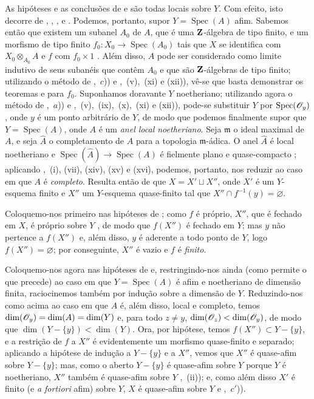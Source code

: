 \begin{env}[8.11.4]
\label{IV.8.11.4}
As hipóteses e as conclusões de  e  são todas locais sobre $Y$.
Com efeito, isto decorre de , , ,  e .
Podemos, portanto, supor $Y=\operatorname{Spec}(A)$ afim.
Sabemos então que existem um subanel $A_0$ de $A$, que é uma $\mathbf{Z}$-álgebra de tipo finito, e um morfismo de tipo finito $f_0:X_0\to\operatorname{Spec}(A_0)$ tais que $X$ se identifica com $X_0\otimes_{A_0}A$ e $f$ com $f_0\times 1$ .
Além disso, $A$ pode ser considerado como limite indutivo de seus subanéis que contêm $A_0$ e que são $\mathbf{Z}$-álgebras de tipo finito; utilizando o método de ,~$c$)) e ,~(v),~(xi) e (xii)), vê-se que basta demonstrar os teoremas  e  para $f_0$.
Suponhamos doravante $Y$ noetheriano; utilizando agora o método de ,~$a$)) e ,~(v),~(ix),~(x),~(xi) e (xii)), pode-se substituir $Y$ por $\operatorname{Spec}(\mathscr{O}_y)$, onde $y$ é um
ponto arbitrário de $Y$, de modo que podemos finalmente supor que $Y=\operatorname{Spec}(A)$, onde $A$ é um \emph{anel local noetheriano}.
Seja $\mathfrak{m}$ o ideal maximal de $A$, e seja $\hat{A}$ o completamento de $A$ para a topologia $\mathfrak{m}$-ádica. O anel $\hat{A}$ é local noetheriano e $\operatorname{Spec}(\hat{A})\to\operatorname{Spec}(A)$ é fielmente plano e quase-compacto ; aplicando ,~(i), (vii), (xiv), (xv) e (xvi), podemos, portanto, nos reduzir ao caso em que $A$ é \emph{completo}.
Resulta então de  que $X=X'\sqcup X''$, onde $X'$ é um $Y$-esquema finito e $X''$ um $Y$-esquema quase-finito tal que $X''\cap f^{-1}(y)=\varnothing$.
\end{env}

Coloquemo-nos primeiro nas hipóteses de ; como $f$ é próprio, $X''$, que é fechado em $X$, é próprio sobre $Y$ , de modo que $f(X'')$ é fechado em $Y$; mas $y$ não pertence a $f(X'')$ e, além disso, $y$ é aderente a todo ponto de $Y$, logo $f(X'')=\varnothing$; por conseguinte, $X''$ é vazio e $f$ é \emph{finito}.

Coloquemo-nos agora nas hipóteses de  e, restringindo-nos ainda (como permite o que precede) ao caso em que $Y=\operatorname{Spec}(A)$ é afim e noetheriano de dimensão finita, raciocinemos também por indução sobre a dimensão de $Y$.
Reduzindo-nos como acima ao caso em que $A$ é, além disso, local e completo, temos $\dim(\mathscr{O}_y)=\dim(A)=\dim(Y)$ e, para todo $z\neq y$, $\dim(\mathscr{O}_z)<\dim(\mathscr{O}_y)$, de modo que $\dim(Y-\{y\})<\dim(Y)$.
Ora, por hipótese, temos $f(X'')\subset Y-\{y\}$, e a restrição de $f$ a $X''$ é evidentemente um morfismo quase-finito e separado; aplicando a hipótese de indução a $Y-\{y\}$ e a $X''$, vemos que $X''$ é quase-afim sobre $Y-\{y\}$; mas, como o aberto $Y-\{y\}$ é quase-afim sobre $Y$ porque $Y$ é noetheriano, $X''$ também é quase-afim sobre $Y$ ,~(ii)); e, como além disso $X'$ é finito (e \emph{a fortiori} afim) sobre $Y$, $X$ é quase-afim sobre $Y$  e ,~$c'$)).

